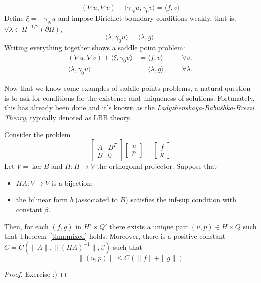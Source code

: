 \begin{itemize}
\begin{equation}
        (\nabla u, \nabla v) - \langle \gamma_N u, \gamma_0 v \rangle = \langle f,v \rangle
    \end{equation}
    Define $\xi = -\gamma_N u$ and impose Dirichlet boundary conditions weakly, that is, $\forall \lambda \in H^{-1/2}(\partial\Omega)$,
    \begin{equation}
         \langle \lambda, \gamma_0 u \rangle = \langle \lambda, g \rangle.
    \end{equation}
    Writing everything together shows a saddle point problem:
    \begin{equation}
        \begin{aligned}
            (\nabla u, \nabla v) + \langle \xi, \gamma_0 v \rangle &= \langle f,v \rangle &&\quad \forall v,\\ 
            \langle \lambda, \gamma_0 u \rangle &= \langle \lambda, g \rangle &&\quad  \forall \lambda.
        \end{aligned}
    \end{equation}
\end{itemize}

Now that we know some examples of saddle points problems, a natural question is to ask for conditions for the existence and uniqueness of solutions. Fortunately, this has already been done and it's known as the \emph{Ladyzhenskaya-Babu\v{s}hka-Brezzi Theory}, typically denoted as LBB theory.
\begin{theorem}\label{thm:mixed}
    Consider the problem
    \begin{equation*}
        \begin{bmatrix}
            A & B^{T}\\ 
            B & 0
        \end{bmatrix}
        \begin{bmatrix}
            u \\ p
        \end{bmatrix}
        =
        \begin{bmatrix}
            f \\ g
        \end{bmatrix}
    \end{equation*}
    Let $V = \ker B$ and $\Pi\colon H\to V$ the orthogonal projector. Suppose that
    \begin{itemize}
        \item $\Pi A\colon V\to V$ is a bijection;
        \item the bilinear form $b$ (associated to $B$) satisfies the inf-sup condition with constant $\beta$.
    \end{itemize}
    Then, for each $(f,g)$ in $H'\times Q'$ there exists a unique pair $(u,p)\in H\times Q$ such that Theorem~\ref{thm:mixed} holds. Moreover, there is a positive constant $C=C(\|A\|, \| (\Pi A)^{-1}\|, \beta)$ such that
    \begin{equation*}
        \| (u,p) \| \le C \left( \|f\| + \|g\| \right) 
    \end{equation*}
    \begin{proof}
        Exercise :)
    \end{proof}
\end{theorem}

